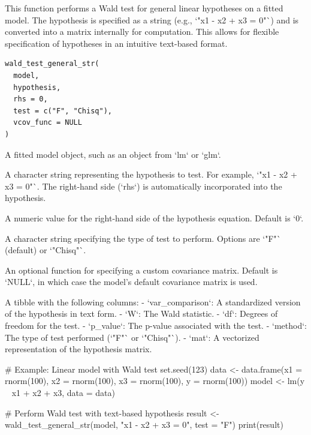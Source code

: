 \documentclass[a4paper]{book}
\begin{document}
%
\begin{Description}
This function performs a Wald test for general linear hypotheses on a fitted model.
The hypothesis is specified as a string (e.g., `"x1 - x2 + x3 = 0"`) and is converted
into a matrix internally for computation. This allows for flexible specification of
hypotheses in an intuitive text-based format.
\end{Description}
%
\begin{Usage}
\begin{verbatim}
wald_test_general_str(
  model,
  hypothesis,
  rhs = 0,
  test = c("F", "Chisq"),
  vcov_func = NULL
)
\end{verbatim}
\end{Usage}
%
\begin{Arguments}
\begin{ldescription}
\item[\code{model}] A fitted model object, such as an object from `lm` or `glm`.

\item[\code{hypothesis}] A character string representing the hypothesis to test.
For example, `"x1 - x2 + x3 = 0"`. The right-hand side (`rhs`) is
automatically incorporated into the hypothesis.

\item[\code{rhs}] A numeric value for the right-hand side of the hypothesis equation.
Default is `0`.

\item[\code{test}] A character string specifying the type of test to perform. Options
are `"F"` (default) or `"Chisq"`.

\item[\code{vcov\_func}] An optional function for specifying a custom covariance matrix.
Default is `NULL`, in which case the model's default covariance matrix is used.
\end{ldescription}
\end{Arguments}
%
\begin{Value}
A tibble with the following columns:
- `var\_comparison`: A standardized version of the hypothesis in text form.
- `W`: The Wald statistic.
- `df`: Degrees of freedom for the test.
- `p\_value`: The p-value associated with the test.
- `method`: The type of test performed (`"F"` or `"Chisq"`).
- `mat`: A vectorized representation of the hypothesis matrix.
\end{Value}
%
\begin{Examples}
\begin{ExampleCode}
# Example: Linear model with Wald test
set.seed(123)
data <- data.frame(x1 = rnorm(100), x2 = rnorm(100), x3 = rnorm(100), y = rnorm(100))
model <- lm(y ~ x1 + x2 + x3, data = data)

# Perform Wald test with text-based hypothesis
result <- wald_test_general_str(model, "x1 - x2 + x3 = 0", test = "F")
print(result)

\end{ExampleCode}
\end{Examples}
\end{document}
